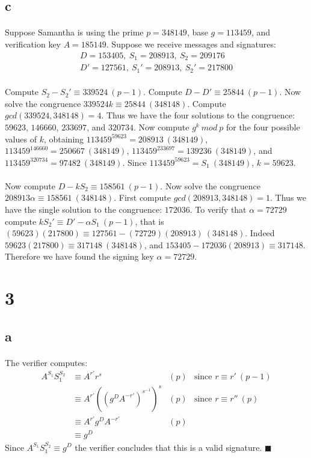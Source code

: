 \documentclass[letterpaper,12pt,oneside,onecolumn]{report}
\begin{document}
\subsection*{c}
\paragraph{}
Suppose Samantha is using the prime $p = 348149$, base $g=113459$, and verification key $A = 185149$. Suppose we receive messages and signatures:
\begin{align*}
D = 153405,\ S_1 = 208913,\ S_2 = 209176 \\
D' = 127561,\ S_1' = 208913,\ S_2' = 217800
\end{align*}
\paragraph{}
Compute $S_2 - S_2' \equiv 339524 \ (p-1)$. Compute $D - D' \equiv 25844\ (p-1)$. Now solve the congruence $339524k \equiv 25844\ (348148)$. Compute $gcd(339524, 348148) = 4$. Thus we have the four solutions to the congruence: $59623$, $146660$, $233697$, and $320734$. Now compute $g^k\ mod\ p$ for the four possible values of $k$, obtaining $113459^{59623}=208913\ (348149)$, $113459^{146660}=250667\ (348149)$, $113459^{233697}= 139236\ (348149)$, and $113459^{320734}=97482\ (348149)$. Since $113459^{59623}=S_1\ (348149)$, $k=59623$.
\paragraph{}
Now compute $D - kS_2 \equiv 158561\ (p-1)$. Now solve the congruence $208913\alpha \equiv 158561\ (348148)$. First compute $gcd(208913, 348148) = 1$. Thus we have the single solution to the congruence: $172036$. To verify that $\alpha = 72729$ compute $kS_2' \equiv D' - \alpha S_1\ (p-1)$, that is $(59623)(217800) \equiv 127561 - (72729)(208913)\ (348148)$. Indeed $59623(217800) \equiv 317148\ (348148)$, and $153405 - 172036(208913) \equiv 317148$.  Therefore we have found the signing key $\alpha = 72729$.
\section*{3}
\subsection*{a}
\paragraph{}
The verifier computes:
\begin{align*}
A^{S_1}S_1^{S_2} &\equiv A^{r'}r^{s} &(p) &\text{since $r \equiv r'\ (p-1)$}\\
&\equiv A^{r'}((g^DA^{-r'})^{s^{-1}})^s &(p) &\text{since $r \equiv r''\ (p)$}\\
&\equiv A^{r'}g^DA^{-r'} &(p) \\
&\equiv g^D
\end{align*}
Since $A^{S_1}S_1^{S_2} \equiv g^D$ the verifier concludes that this is a valid signature. $\blacksquare$
\end{document}
